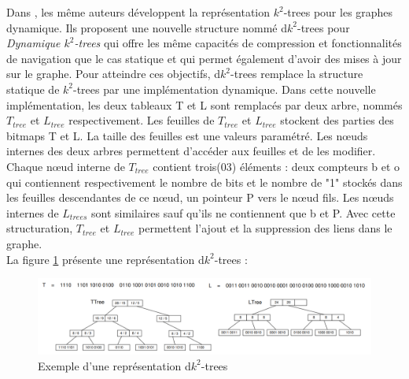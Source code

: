 Dans \citep{brisaboa2012compressed}, les même auteurs développent la représentation $k^2$-trees pour les graphes dynamique. Ils proposent une nouvelle structure nommé d$k^2$-trees pour \textit{Dynamique $k^2$-trees} qui offre les même capacités de compression et fonctionnalités de navigation que le cas statique et qui permet également d'avoir des mises à jour sur le graphe. Pour atteindre ces objectifs, d$k^2$-trees remplace la structure statique de $k^2$-trees par une implémentation dynamique. Dans cette nouvelle implémentation, les deux tableaux T et L sont remplacés par deux arbre, nommés $T_{tree}$ et $L_{tree}$ respectivement. Les feuilles de $T_{tree}$ et $L_{tree}$ stockent des parties des bitmaps T et L. La taille des feuilles est une valeurs paramétré. Les nœuds internes des deux arbres permettent d'accéder aux feuilles et  de les modifier.
Chaque nœud interne de $T_{tree}$ contient trois(03) éléments : deux compteurs b et o qui contiennent respectivement le nombre de bits et le nombre de "1" stockés dans les feuilles descendantes de ce nœud, un pointeur P vers le nœud fils. Les nœuds internes de $L_{trees}$ sont similaires sauf qu'ils ne contiennent que b et P. Avec cette structuration, $T_{tree}$ et $L_{tree}$ permettent l'ajout et la suppression des liens dans le graphe.\\
La figure \ref{dk2-trees} présente une représentation d$k^2$-trees \citep{brisaboa2012compressed}: 
\begin{figure}[H]
\begin{center}
\includegraphics[height=100 pt, width=380 pt]{./ressources/image/dk2-trees.png} 
\end{center}
\caption{Exemple d'une représentation d$k^2$-trees}
\label{dk2-trees}
\end{figure}

